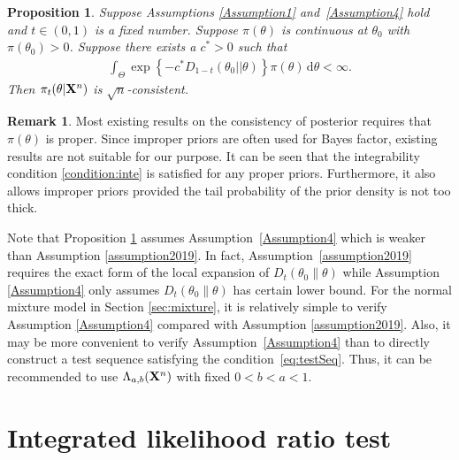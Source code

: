 \documentclass[11pt]{article}
\theoremstyle{plain}
\newtheorem{proposition}{\quad\quad Proposition}
\theoremstyle{definition}
\newtheorem{remark}{\quad\quad Remark}
\theoremstyle{remark}
\begin{document}
\begin{proposition}\label{Theoremless1}
    Suppose Assumptions \ref{Assumption1} and~\ref{Assumption4} hold and $t\in(0,1)$ is a fixed number.
    Suppose $\pi(\theta)$ is continuous at $\theta_0$ with $\pi(\theta_0)>0$.
    Suppose there exists a $c^* > 0$ such that
    \begin{align}\label{condition:inte}
    \int_{\Theta } 
    \exp \left\{  - c^* D_{1-t}(\theta_0||\theta)  \right\} \pi(\theta) \, \mathrm d \theta
< \infty.
    \end{align}
Then $\pi_t(\theta | \mathbf{X}^{n})$ is $\sqrt n$-consistent.
\end{proposition}
\begin{remark}
    Most existing results on the consistency of posterior requires that $\pi(\theta)$ is proper.
    Since improper priors are often used for Bayes factor, existing results are not suitable for our purpose.
    It can be seen that the integrability condition \eqref{condition:inte}
    is satisfied for any proper priors.
    Furthermore, it also allows improper priors provided the tail probability of the prior density is not too thick. 
\end{remark}
Note that Proposition \ref{Theoremless1} assumes Assumption~\ref{Assumption4} which is weaker than Assumption \ref{assumption2019}.
In fact, Assumption~\ref{assumption2019} requires the exact form of the local expansion of $D_t(\theta_0 \| \theta)$ 
while Assumption \ref{Assumption4} only assumes $D_t(\theta_0 \| \theta)$ has certain lower bound.
For the normal mixture model in Section \ref{sec:mixture}, it is relatively simple to verify Assumption \ref{Assumption4} compared with Assumption \ref{assumption2019}.
Also, it may be more convenient to verify Assumption~\ref{Assumption4} than to directly construct a test sequence satisfying the condition~\eqref{eq:testSeq}.
Thus, it can be recommended to use $\Lambda_{a,b}(\mathbf{X}^n)$ with fixed $0< b< a< 1$.






\section{Integrated likelihood ratio test} \label{sec:ilrt}
\end{document}
